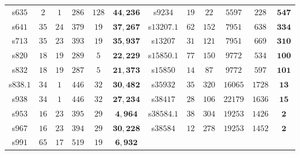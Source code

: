 {\begin{tabular}{c|c|c|c|c|c||c|c|c|c|c|c}
s$635$   & $2$   & $1$   & $286$  & $128$  & $\mathbf{44,236}$ & s$9234$ & $19$ & $22$ & $5597$ & $228$ & $\mathbf{547}$\\ 
s$641$   & $35$ & $24$ & $379$ & $19$  & $\mathbf{37,267}$ & s$13207.1$ & $62$ & $152$ & $7951$ & $638$ & $\mathbf{334}$\\ 
s$713$   & $35$ & $23$ & $393$ & $19$  & $\mathbf{35,937}$ & s$13207$ & $31$ & $121$ & $7951$ & $669$ & $\mathbf{310}$\\ 
s$820$   & $18$ & $19$ & $289$ & $5$  & $\mathbf{22,229}$ & s$15850.1$ & $77$ & $150$ & $9772$ & $534$ & $\mathbf{100}$\\ 
s$832$   & $18$ & $19$ & $287$ & $5$  & $\mathbf{21,373}$ & s$15850$ & $14$ & $87$ & $9772$ & $597$ & $\mathbf{101}$\\ 
s$838.1$ & $34$ & $1$  & $446$ & $32$  & $\mathbf{30,482}$ & s$35932$ & $35$ & $320$ & $16065$ & $1728$ & $\mathbf{13}$\\ 
s$938$   & $34$ & $1$ & $446$ & $32$  & $\mathbf{27,234}$ & s$38417$ & $28$ & $106$ & $22179$ & $1636$ & $\mathbf {15}$\\ 
s$953$   & $16$ & $23$ & $395$ & $29$  & $\mathbf{4,964}$ & s$38584.1$ & $38$ & $304$ & $19253$ & $1426$ &  $\mathbf {2}$\\ 
s$967$   & $16$ & $23$ & $394$ & $29$  & $\mathbf{30,228}$ & s$38584$ & $12$ & $278$ & $19253$ & $1452$ & $\mathbf {2}$ \\ 
s$991$   & $65$ & $17$ & $519$ & $19$ & $\mathbf{6,932}$ &  \\
\midrule
\hline
\end{tabular}}